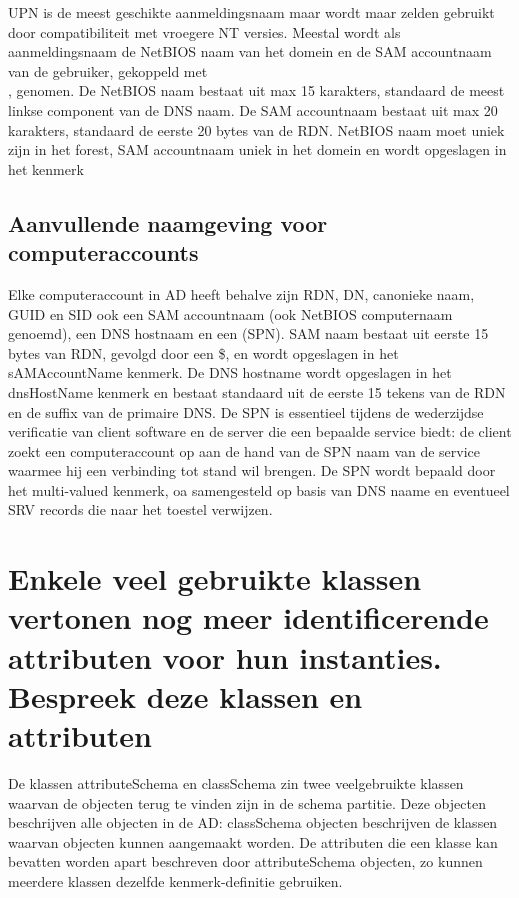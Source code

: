 UPN is de meest geschikte aanmeldingsnaam maar wordt maar zelden gebruikt door
compatibiliteit met vroegere NT versies. Meestal wordt als aanmeldingsnaam de
NetBIOS naam van het domein en de SAM accountnaam van de gebruiker, gekoppeld
met \\, genomen. De NetBIOS naam bestaat uit max 15 karakters, standaard de meest
linkse component van de DNS naam. De SAM accountnaam bestaat uit max 20
karakters, standaard de eerste 20 bytes van de RDN. NetBIOS naam moet uniek zijn
in het forest, SAM accountnaam uniek in het domein en wordt opgeslagen in het
 kenmerk

\subsection{Aanvullende naamgeving voor computeraccounts}

Elke computeraccount in AD heeft behalve zijn RDN, DN, canonieke naam, GUID en
SID ook een SAM accountnaam (ook NetBIOS computernaam genoemd), een DNS hostnaam
en een  (SPN).
SAM naam bestaat uit eerste 15 bytes van RDN, gevolgd door een \$, en wordt
opgeslagen in het sAMAccountName kenmerk.
De DNS hostname wordt opgeslagen in het dnsHostName kenmerk en bestaat
standaard uit de eerste 15 tekens van de RDN en de suffix van de primaire DNS.
De SPN is essentieel tijdens de wederzijdse verificatie van client software en
de server die een bepaalde service biedt: de client zoekt een computeraccount op
aan de hand van de SPN naam van de service waarmee hij een verbinding tot stand
wil brengen. De SPN wordt bepaald door het multi-valued
 kenmerk, oa samengesteld op basis van DNS naame en
eventueel SRV records die naar het toestel verwijzen.

\section{Enkele veel gebruikte klassen vertonen nog meer identificerende
attributen voor hun instanties. Bespreek deze klassen en attributen}

De klassen attributeSchema en classSchema zin twee veelgebruikte klassen waarvan
de objecten terug te vinden zijn in de schema partitie. Deze objecten
beschrijven alle objecten in de AD: classSchema objecten beschrijven de klassen
waarvan objecten kunnen aangemaakt worden. De attributen die een klasse kan
bevatten worden apart beschreven door attributeSchema objecten, zo kunnen
meerdere klassen dezelfde kenmerk-definitie gebruiken.

